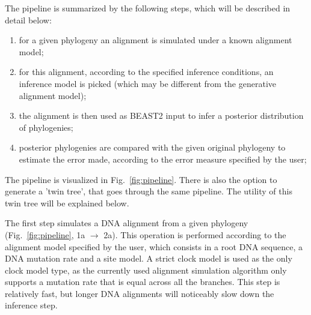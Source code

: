 \documentclass{article}
\begin{document}
The pipeline is summarized by the following steps, which will be described in detail below:
\begin{enumerate}
    \item for a given phylogeny an alignment is simulated under a known alignment model;
    \item for this alignment, according to the specified inference conditions, an inference model is picked (which may be different from the generative alignment model);
    \item the alignment is then used as BEAST2 input to infer a posterior distribution of phylogenies;
    \item posterior phylogenies are compared with the given original phylogeny to estimate the error made, according to the error measure specified by the user;
\end{enumerate}
The pipeline is visualized in Fig.~\ref{fig:pipeline}. 
There is also the option to generate a 'twin tree', 
that goes through the same pipeline. 
The utility of this twin tree will be explained below.

The first step simulates a DNA alignment from a given 
phylogeny (Fig.~\ref{fig:pipeline}, 1a $\rightarrow$ 2a).
This operation is performed according to the alignment model 
specified by the user, which consists in a root DNA sequence, 
a DNA mutation rate and a site model.
A strict clock model is used as the only clock model
type, as the currently used alignment simulation algorithm
only supports a mutation rate that is equal across all the branches.
This step is relatively fast, 
but longer DNA alignments will noticeably slow down the inference step.
\end{document}
